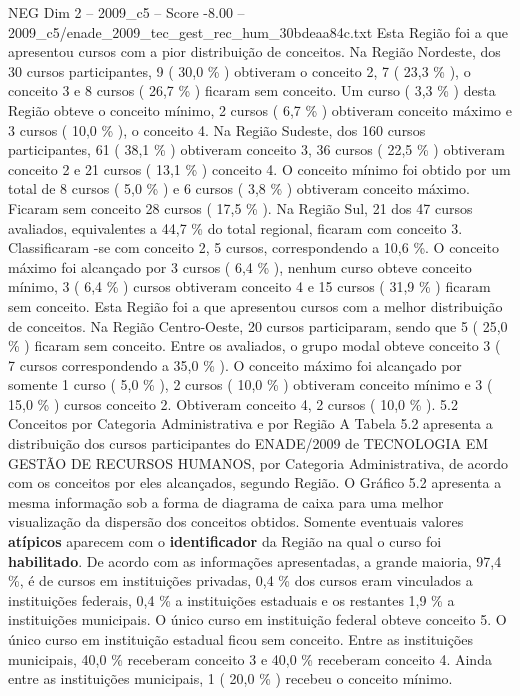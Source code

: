 \begin{textsample}{NEG Dim 2 – 2009\_c5 – Score -8.00 – 2009\_c5/enade\_2009\_tec\_gest\_rec\_hum\_30bdeaa84c.txt}
Esta Região foi a que apresentou cursos com a pior distribuição de conceitos.
Na Região Nordeste, dos 30 cursos participantes, 9 ( 30,0 \% ) obtiveram o conceito 2, 7 ( 23,3 \% ), o conceito 3 e 8 cursos ( 26,7 \% ) ficaram sem conceito.
Um curso ( 3,3 \% ) desta Região obteve o conceito mínimo, 2 cursos ( 6,7 \% ) obtiveram conceito máximo e 3 cursos ( 10,0 \% ), o conceito 4.
Na Região Sudeste, dos 160 cursos participantes, 61 ( 38,1 \% ) obtiveram conceito 3, 36 cursos ( 22,5 \% ) obtiveram conceito 2 e 21 cursos ( 13,1 \% ) conceito 4.
O conceito mínimo foi obtido por um total de 8 cursos ( 5,0 \% ) e 6 cursos ( 3,8 \% ) obtiveram conceito máximo.
Ficaram sem conceito 28 cursos ( 17,5 \% ).
Na Região Sul, 21 dos 47 cursos avaliados, equivalentes a 44,7 \% do total regional, ficaram com conceito 3.
Classificaram -se com conceito 2, 5 cursos, correspondendo a 10,6 \%.
O conceito máximo foi alcançado por 3 cursos ( 6,4 \% ), nenhum curso obteve conceito mínimo, 3 ( 6,4 \% ) cursos obtiveram conceito 4 e 15 cursos ( 31,9 \% ) ficaram sem conceito.
Esta Região foi a que apresentou cursos com a melhor distribuição de conceitos.
Na Região Centro-Oeste, 20 cursos participaram, sendo que 5 ( 25,0 \% ) ficaram sem conceito.
Entre os avaliados, o grupo modal obteve conceito 3 ( 7 cursos correspondendo a 35,0 \% ).
O conceito máximo foi alcançado por somente 1 curso ( 5,0 \% ), 2 cursos ( 10,0 \% ) obtiveram conceito mínimo e 3 ( 15,0 \% ) cursos conceito 2.
Obtiveram conceito 4, 2 cursos ( 10,0 \% ). 5.2 Conceitos por Categoria Administrativa e por Região A Tabela 5.2 apresenta a distribuição dos cursos participantes do ENADE/2009 de TECNOLOGIA EM GESTÃO DE RECURSOS HUMANOS, por Categoria Administrativa, de acordo com os conceitos por eles alcançados, segundo Região.
O Gráfico 5.2 apresenta a mesma informação sob a forma de diagrama de caixa para uma melhor visualização da dispersão dos conceitos obtidos.
Somente eventuais valores \textbf{atípicos} aparecem com o \textbf{identificador} da Região na qual o curso foi \textbf{habilitado}.
De acordo com as informações apresentadas, a grande maioria, 97,4 \%, é de cursos em instituições privadas, 0,4 \% dos cursos eram vinculados a instituições federais, 0,4 \% a instituições estaduais e os restantes 1,9 \% a instituições municipais.
O único curso em instituição federal obteve conceito 5.
O único curso em instituição estadual ficou sem conceito.
Entre as instituições municipais, 40,0 \% receberam conceito 3 e 40,0 \% receberam conceito 4.
Ainda entre as instituições municipais, 1 ( 20,0 \% ) recebeu o conceito mínimo.

\end{textsample}
